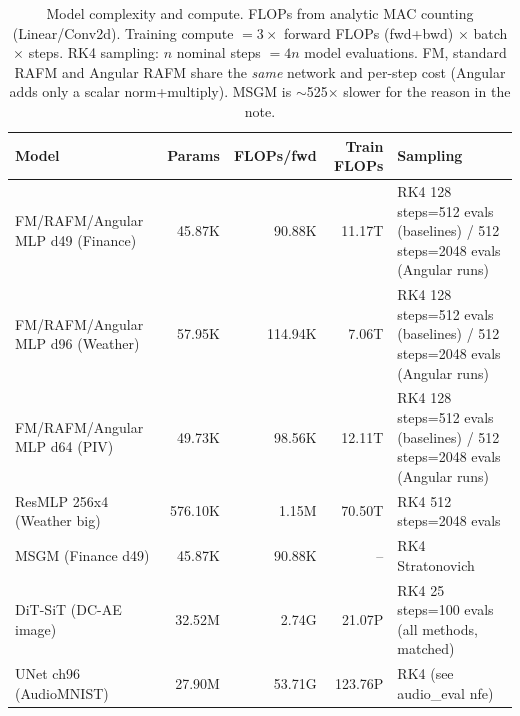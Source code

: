 \begin{table}[t]\centering
\caption{Model complexity and compute. FLOPs from analytic MAC counting (Linear/Conv2d). Training compute $=3\times$ forward FLOPs (fwd+bwd) $\times$ batch $\times$ steps. RK4 sampling: $n$ nominal steps $=4n$ model evaluations. FM, standard RAFM and Angular RAFM share the \emph{same} network and per-step cost (Angular adds only a scalar norm+multiply). MSGM is $\sim$525$\times$ slower for the reason in the note.}
\label{tab:efficiency}
\small
\begin{tabular}{lrrrl}
\toprule
Model & Params & FLOPs/fwd & Train FLOPs & Sampling \\
\midrule
FM/RAFM/Angular MLP d49 (Finance) & 45.87K & 90.88K & 11.17T & RK4 128 steps=512 evals (baselines) / 512 steps=2048 evals (Angular runs) \\
FM/RAFM/Angular MLP d96 (Weather) & 57.95K & 114.94K & 7.06T & RK4 128 steps=512 evals (baselines) / 512 steps=2048 evals (Angular runs) \\
FM/RAFM/Angular MLP d64 (PIV) & 49.73K & 98.56K & 12.11T & RK4 128 steps=512 evals (baselines) / 512 steps=2048 evals (Angular runs) \\
ResMLP 256x4 (Weather big) & 576.10K & 1.15M & 70.50T & RK4 512 steps=2048 evals \\
MSGM (Finance d49) & 45.87K & 90.88K & -- & RK4 Stratonovich \\
DiT-SiT (DC-AE image) & 32.52M & 2.74G & 21.07P & RK4 25 steps=100 evals (all methods, matched) \\
UNet ch96 (AudioMNIST) & 27.90M & 53.71G & 123.76P & RK4 (see audio_eval nfe) \\
\bottomrule
\end{tabular}
\end{table}